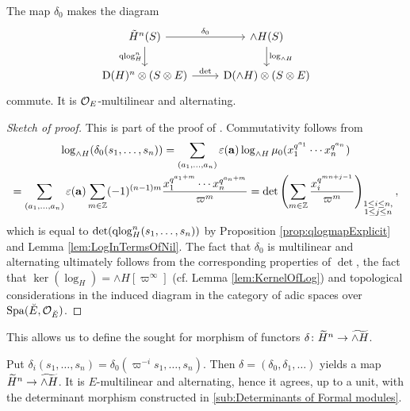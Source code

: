 \documentclass[../main.tex]{subfiles}
\begin{document}
\begin{prop}\label{prop:commutativityofdeterminantqlogdiag}
  The map $\delta_0$ makes the diagram 
  \begin{equation*}
    \begin{tikzcd}[ampersand replacement=\&]
    	{\tilde H^n(S)} \& {\wedge H(S)} \\
    	{\Dio(H)^n \otimes (S \otimes E)} \& {\Dio(\wedge H) \otimes(S \otimes E)}
    	\arrow["{\delta_0}", from=1-1, to=1-2]
    	\arrow["{\qlog_H^n}"', from=1-1, to=2-1]
    	\arrow["{\log_{\wedge H}}", from=1-2, to=2-2]
    	\arrow["\det", from=2-1, to=2-2]
    \end{tikzcd}
  \end{equation*}
  commute. It is $\cO_E$-multilinear and alternating. 
  \begin{proof}[Sketch of proof] 
  This is part of the proof of \cite[Theorem
  2.10.3]{BoyarchenkoWeinstein2011MaxVar}.
  Commutativity follows from 
  \begin{multline*}
    \log_{\wedge H}(\delta_0(s_1, \dots, s_n)) = \sum_{(a_1, \dots, a_n)} 
    \varepsilon(\mathbf a) \log_{\wedge H} \mu_0( x_1^{q^{a_1}}\cdots x_n^{q^{a_n}})
     \\ = \sum_{(a_1, \dots, a_n)} \varepsilon(\mathbf a) \sum_{m \in \Z} (-1)^{(n-1)m}
    \frac{x_1^{q^{a_1+m}} \cdots x_n^{q^{a_n+m}}}{\varpi^m} 
    = \det \left( \sum_{m \in \Z} \frac{x_i^{q^{mn + j-1}}}{\varpi^m} \right)_{\substack{
      1 \leq i \leq n,\\
      1 \leq j \leq n}},
  \end{multline*}
  which is equal to $\det(\qlog_H^n(s_1, \dots, s_n))$ by Proposition 
  \ref{prop:qlogmapExplicit} and Lemma \ref{lem:LogInTermsOfNil}. 
  The fact that $\delta_0$ is multilinear and alternating ultimately follows
  from the corresponding properties of $\det$, the fact that $\ker(\log_H) =
  \wedge H[\varpi^\infty]$ (cf. Lemma \ref{lem:KernelOfLog}) and topological
  considerations in the induced diagram in the category of adic spaces over
  $\spa(\breve E, \cO_{\breve E})$.
\end{proof}
\end{prop}

This allows us to define the sought for morphism of functors
$\delta\colon \Tilde H^n \to \Tilde {\wedge H}$. 
\begin{defi}\label{def:DeltaMap}
  Put $\delta_i(s_1, \dots, s_n) = \delta_0(\varpi^{-i} s_1, \dots, s_n)$. Then 
  $\delta = (\delta_0, \delta_1, \dots)$ yields a map 
  $\Tilde H^n \to \Tilde{\wedge H}$. It is $E$-multilinear and alternating, 
  hence it agrees, up to a unit, with the determinant morphism constructed in 
  \cref{sub:Determinants of Formal modules}.
\end{defi}
\end{document}
